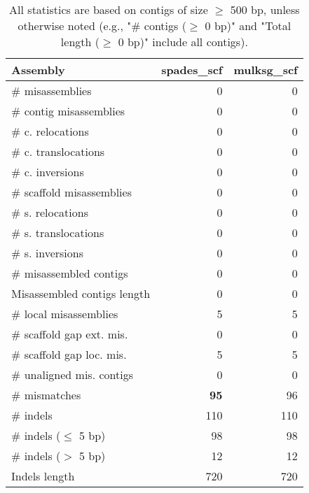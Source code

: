 \documentclass[12pt,a4paper]{article}
\begin{document}
\begin{table}[ht]
\begin{center}
\caption{All statistics are based on contigs of size $\geq$ 500 bp, unless otherwise noted (e.g., "\# contigs ($\geq$ 0 bp)" and "Total length ($\geq$ 0 bp)" include all contigs).}
\begin{tabular}{|l*{2}{|r}|}
\hline
Assembly & spades\_scf & mulksg\_scf \\ \hline
\# misassemblies & 0 & 0 \\ \hline
\hspace{2mm}\# contig misassemblies & 0 & 0 \\ \hline
\hspace{5mm}\# c. relocations & 0 & 0 \\ \hline
\hspace{5mm}\# c. translocations & 0 & 0 \\ \hline
\hspace{5mm}\# c. inversions & 0 & 0 \\ \hline
\hspace{2mm}\# scaffold misassemblies & 0 & 0 \\ \hline
\hspace{5mm}\# s. relocations & 0 & 0 \\ \hline
\hspace{5mm}\# s. translocations & 0 & 0 \\ \hline
\hspace{5mm}\# s. inversions & 0 & 0 \\ \hline
\# misassembled contigs & 0 & 0 \\ \hline
Misassembled contigs length & 0 & 0 \\ \hline
\# local misassemblies & 5 & 5 \\ \hline
\# scaffold gap ext. mis. & 0 & 0 \\ \hline
\# scaffold gap loc. mis. & 5 & 5 \\ \hline
\# unaligned mis. contigs & 0 & 0 \\ \hline
\# mismatches & {\bf 95} & 96 \\ \hline
\# indels & 110 & 110 \\ \hline
\hspace{5mm}\# indels ($\leq$ 5 bp) & 98 & 98 \\ \hline
\hspace{5mm}\# indels ($>$ 5 bp) & 12 & 12 \\ \hline
Indels length & 720 & 720 \\ \hline
\end{tabular}
\end{center}
\end{table}
\end{document}
